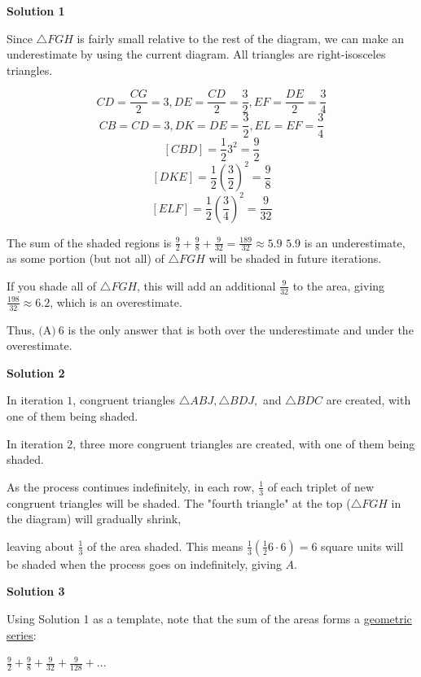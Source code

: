 \begin{enumerate}
\textbf{Solution 1}

Since $\triangle FGH$ is fairly small relative to the rest of the diagram, we can make an underestimate by using the current diagram.  All triangles are right-isosceles triangles.

 
 \[CD = \frac {CG}{2} = 3, DE = \frac{CD}{2} = \frac{3}{2}, EF = \frac{DE}{2} = \frac{3}{4}\]
 \[CB = CD = 3, DK = DE = \frac{3}{2}, EL = EF = \frac{3}{4}\]
 \[[CBD] = \frac{1}{2}3^2 = \frac{9}{2}\]
 \[[DKE] = \frac{1}{2}(\frac{3}{2})^2 = \frac{9}{8}\]
 \[[ELF] = \frac{1}{2}(\frac{3}{4})^2 = \frac{9}{32}\]

 The sum of the shaded regions is $\frac{9}{2} + \frac{9}{8} + \frac{9}{32} = \frac{189}{32} \approx 5.9$
$5.9$ is an underestimate, as some portion (but not all) of $\triangle FGH$ will be shaded in future iterations.  

 If you shade all of $\triangle FGH$, this will add an additional $\frac{9}{32}$ to the area, giving $\frac{198}{32} \approx 6.2$, which is an overestimate.

 Thus, $\boxed{\text{(A)}\ 6}$ is the only answer that is both over the underestimate and under the overestimate.

 



\textbf{Solution 2}

In iteration $1$, congruent triangles $\triangle ABJ,  \triangle BDJ,$ and $\triangle BDC$ are created, with one of them being shaded.

 In iteration $2$, three more congruent triangles are created, with one of them being shaded.

 As the process continues indefinitely, in each row, $\frac{1}{3}$ of each triplet of new congruent triangles will be shaded.  The "fourth triangle" at the top ($\triangle FGH$ in the diagram) will gradually shrink, 

 leaving about $\frac{1}{3}$ of the area shaded.  This means $\frac{1}{3}\left(\frac{1}{2}6\cdot 6\right) = 6$ square units will be shaded when the process goes on indefinitely, giving $\boxed{A}$.

 



\textbf{Solution 3}

Using Solution 1 as a template, note that the sum of the areas forms a \href{https://artofproblemsolving.com/wiki/index.php?title=Geometric\_series}{geometric series}:

 $\frac{9}{2} + \frac{9}{8} + \frac{9}{32} + \frac{9}{128} + ...$


\end{enumerate}
